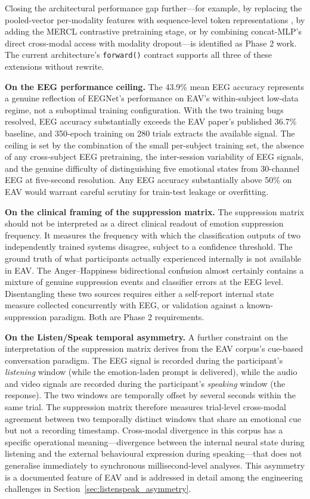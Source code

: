 Closing the architectural performance gap further---for example, by replacing the pooled-vector per-modality features with sequence-level token representations \cite{Lee2024MERCL}, by adding the MERCL contrastive pretraining stage, or by combining concat-MLP's direct cross-modal access with modality dropout---is identified as Phase 2 work. The current architecture's \texttt{forward()} contract supports all three of these extensions without rewrite.

\textbf{On the EEG performance ceiling.} The 43.9\% mean EEG accuracy represents a genuine reflection of EEGNet's performance on EAV's within-subject low-data regime, not a suboptimal training configuration. With the two training bugs resolved, EEG accuracy substantially exceeds the EAV paper's published 36.7\% baseline, and 350-epoch training on 280 trials extracts the available signal. The ceiling is set by the combination of the small per-subject training set, the absence of any cross-subject EEG pretraining, the inter-session variability of EEG signals, and the genuine difficulty of distinguishing five emotional states from 30-channel EEG at five-second resolution. Any EEG accuracy substantially above 50\% on EAV would warrant careful scrutiny for train-test leakage or overfitting.

\textbf{On the clinical framing of the suppression matrix.} The suppression matrix should not be interpreted as a direct clinical readout of emotion suppression frequency. It measures the frequency with which the classification outputs of two independently trained systems disagree, subject to a confidence threshold. The ground truth of what participants actually experienced internally is not available in EAV. The Anger--Happiness bidirectional confusion almost certainly contains a mixture of genuine suppression events and classifier errors at the EEG level. Disentangling these two sources requires either a self-report internal state measure collected concurrently with EEG, or validation against a known-suppression paradigm. Both are Phase 2 requirements.

\textbf{On the Listen/Speak temporal asymmetry.} A further constraint on the interpretation of the suppression matrix derives from the EAV corpus's cue-based conversation paradigm. The EEG signal is recorded during the participant's \emph{listening} window (while the emotion-laden prompt is delivered), while the audio and video signals are recorded during the participant's \emph{speaking} window (the response). The two windows are temporally offset by several seconds within the same trial. The suppression matrix therefore measures trial-level cross-modal agreement between two temporally distinct windows that share an emotional cue but not a recording timestamp. Cross-modal divergence in this corpus has a specific operational meaning---divergence between the internal neural state during listening and the external behavioural expression during speaking---that does not generalise immediately to synchronous millisecond-level analyses. This asymmetry is a documented feature of EAV \cite{Lee2024EAV} and is addressed in detail among the engineering challenges in Section~\ref{sec:listenspeak_asymmetry}.

